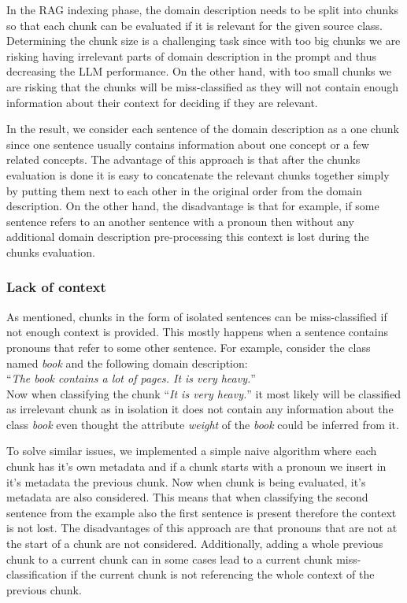 In the RAG indexing phase, the domain description needs to be split into chunks so that each chunk can be evaluated if it is relevant for the given source class. Determining the chunk size is a challenging task since with too big chunks we are risking having irrelevant parts of domain description in the prompt and thus decreasing the LLM performance. On the other hand, with too small chunks we are risking that the chunks will be miss-classified as they will not contain enough information about their context for deciding if they are relevant.

In the result, we consider each sentence of the domain description as a one chunk since one sentence usually contains information about one concept or a few related concepts. The advantage of this approach is that after the chunks evaluation is done it is easy to concatenate the relevant chunks together simply by putting them next to each other in the original order from the domain description. On the other hand, the disadvantage is that for example, if some sentence refers to an another sentence with a pronoun then without any additional domain description pre-processing this context is lost during the chunks evaluation.


\subsubsection{Lack of context}

As mentioned, chunks in the form of isolated sentences can be miss-classified if not enough context is provided. This mostly happens when a sentence contains pronouns that refer to some other sentence. For example, consider the class named \textit{book} and the following domain description: \\

\noindent{}``\textit{The book contains a lot of pages. It is very heavy.}'' \\

\noindent{}Now when classifying the chunk ``\textit{It is very heavy.}'' it most likely will be classified as irrelevant chunk as in isolation it does not contain any information about the class \textit{book} even thought the attribute \textit{weight} of the \textit{book} could be inferred from it.

To solve similar issues, we implemented a simple naive algorithm where each chunk has it's own metadata and if a chunk starts with a pronoun we insert in it's metadata the previous chunk. Now when chunk is being evaluated, it's metadata are also considered. This means that when classifying the second sentence from the example also the first sentence is present therefore the context is not lost. The disadvantages of this approach are that pronouns that are not at the start of a chunk are not considered. Additionally, adding a whole previous chunk to a current chunk can in some cases lead to a current chunk miss-classification if the current chunk is not referencing the whole context of the previous chunk.

